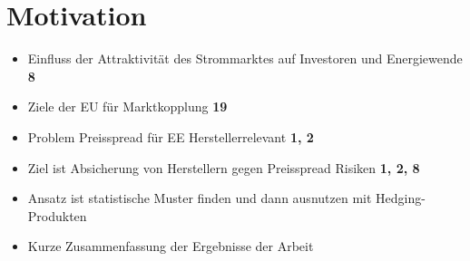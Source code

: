 \section{Motivation}
\label{sec:Motivation}

\begin{itemize}
    \item Einfluss der Attraktivität des Strommarktes auf Investoren und Energiewende \textbf{8}
    \item Ziele der EU für Marktkopplung \textbf{19}
    \item Problem Preisspread für EE Herstellerrelevant \textbf{1, 2}
    \item Ziel ist Absicherung von Herstellern gegen Preisspread Risiken \textbf{1, 2, 8}
    \item Ansatz ist statistische Muster finden und dann ausnutzen mit Hedging-Produkten
    \item Kurze Zusammenfassung der Ergebnisse der Arbeit
\end{itemize}